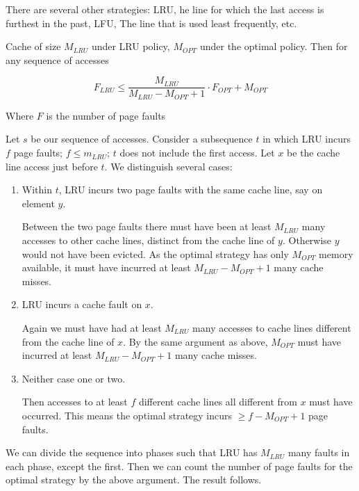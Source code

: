 There are several other strategies: LRU, he line for which the last access is furthest in the past, LFU, The line that is used least frequently, etc.

\begin{thm} Cache of size $M_{LRU}$ under LRU policy, $M_{OPT}$ under the optimal policy. Then 
for any sequence of accesses

\[F_{LRU} \leq \frac{M_{LRU}}{M_{LRU}-M_{OPT}+1} \cdot F_{OPT}+ M_{OPT}\]

Where $F$ is the number of page faults
\end{thm}

\begin{pr} Let $s$ be our sequence of accesses. Consider a subsequence $t$ in which LRU incurs $f$ page faults; $f\leq m_{LRU}$; $t$ does not include the first access. Let $x$ be the cache line access just before $t$. We distinguish several cases:

\begin{enumerate}
\item Within $t$, LRU incurs two page faults with the same cache line, say on element $y$. 

Between the two page faults there must have been at least $M_{LRU}$ many accesses to other cache lines, distinct from the cache line of $y$. Otherwise $y$ would not have been evicted. As the optimal strategy has only $M_{OPT}$ memory available, it must have incurred at least $M_{LRU}-M_{OPT}+1$ many cache misses.

\item LRU incurs a cache fault on $x$.

Again we must have had at least $M_{LRU}$ many accesses to cache lines different from the cache line of $x$. By the same argument as above, $M_{OPT}$ must have incurred at least $M_{LRU}-M_{OPT}+1$ many cache misses.

\item Neither case one or two.

Then accesses to at least $f$ different cache lines all different from $x$ must have occurred. This means the optimal strategy incurs $\geq f-M_{OPT}+1$ page faults.
\end{enumerate}

We can divide the sequence into phases such that LRU has $M_{LRU}$ many faults in each phase, except the first. Then we can count the number of page faults for the optimal strategy by the above argument. The result follows.
\end{pr}

